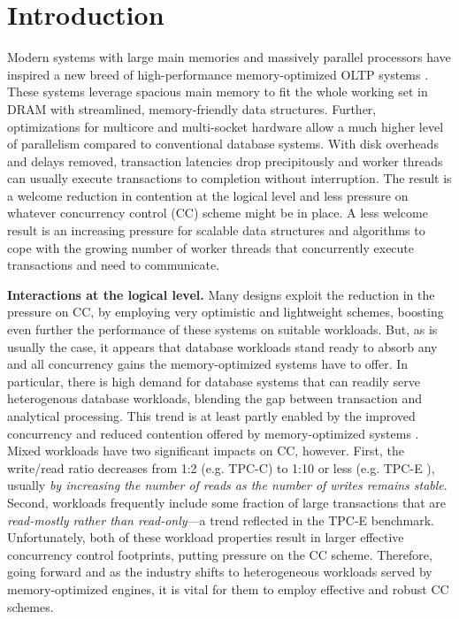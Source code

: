 
\section{Introduction}

Modern systems with large main memories and massively parallel processors have inspired a new breed of high-performance memory-optimized OLTP systems \cite{Kallman+08,PandisJHA10,KemperN11,LarsonBDFPZ11,TuZKLM13}. These systems leverage spacious main memory to fit the whole working set in DRAM with streamlined, memory-friendly data structures. Further, optimizations for multicore and multi-socket hardware allow a much higher level of parallelism compared to conventional database systems. With disk overheads and delays removed, transaction latencies drop precipitously and worker threads can usually execute transactions to completion without interruption. The result is a welcome reduction in contention at the logical level and less pressure on whatever concurrency control (CC) scheme might be in place. A less welcome result is an increasing pressure for scalable data structures and algorithms to cope with the growing number of worker threads that concurrently execute transactions and need to communicate.


\vspace{2mm}
{\bf Interactions at the logical level.} 
Many designs exploit the reduction in the pressure on CC, by employing very optimistic and lightweight schemes, boosting even further the performance of these systems on suitable workloads.
But, as is usually the case, it appears that database workloads stand ready to absorb any and all concurrency gains the memory-optimized systems have to offer. In particular, there is high demand for database systems that can readily serve heterogenous database workloads, blending the gap between transaction and analytical processing. This trend is at least partly enabled by the improved concurrency and reduced contention offered by memory-optimized systems \cite{Farber+12}. Mixed workloads have two significant impacts on CC, however. First, the write/read ratio decreases from 1:2 (e.g. TPC-C) to 1:10 or less (e.g. TPC-E \cite{Chen+10,TozunPKJA13}), usually {\it by increasing the number of reads as the number of writes remains stable}. 
Second, workloads frequently include some fraction of large transactions that are {\it read-mostly rather than read-only}---a trend reflected in the TPC-E benchmark. Unfortunately, both of these workload properties result in larger effective concurrency control footprints, putting pressure on the CC scheme. 
Therefore, going forward and as the industry shifts to heterogeneous workloads served by memory-optimized engines, it is vital for them to employ effective and robust CC schemes. 

